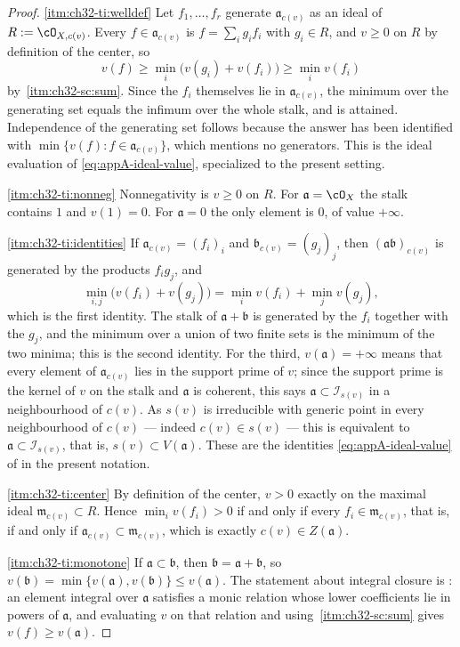 \begin{proof}
\cref{itm:ch32-ti:welldef}  Let $f_1,\ldots,f_r$ generate
$\mathfrak a_{c(v)}$ as an ideal of $R:=\cO_{X,c(v)}$.  Every
$f\in\mathfrak a_{c(v)}$ is $f=\sum_ig_if_i$ with $g_i\in R$, and
$v\geq0$ on $R$ by definition of the center, so
\[
 v(f)\geq\min_i\bigl(v(g_i)+v(f_i)\bigr)\geq\min_iv(f_i)
\]
by \,\cref{itm:ch32-sc:sum}.  Since the
$f_i$ themselves lie in $\mathfrak a_{c(v)}$, the minimum over the
generating set equals the infimum over the whole stalk, and is attained.
Independence of the generating set follows because the answer has been
identified with $\min\{v(f):f\in\mathfrak a_{c(v)}\}$, which mentions no
generators.  This is the ideal evaluation of \eqref{eq:appA-ideal-value},
specialized to the present setting.

\cref{itm:ch32-ti:nonneg}  Nonnegativity is $v\geq0$ on $R$.  For
$\mathfrak a=\cO_X$ the stalk contains $1$ and $v(1)=0$.  For
$\mathfrak a=0$ the only element is $0$, of value $+\infty$.

\cref{itm:ch32-ti:identities}  If $\mathfrak a_{c(v)}=(f_i)_i$ and
$\mathfrak b_{c(v)}=(g_j)_j$, then $(\mathfrak a\mathfrak b)_{c(v)}$ is
generated by the products $f_ig_j$, and
\[
 \min_{i,j}\bigl(v(f_i)+v(g_j)\bigr)=\min_iv(f_i)+\min_jv(g_j),
\]
which is the first identity.  The stalk of $\mathfrak a+\mathfrak b$ is
generated by the $f_i$ together with the $g_j$, and the minimum over a
union of two finite sets is the minimum of the two minima; this is the second
identity.  For the third, $v(\mathfrak a)=+\infty$ means that every element
of $\mathfrak a_{c(v)}$ lies in the support prime of $v$; since the
support prime is the kernel of $v$ on the stalk and $\mathfrak a$ is
coherent, this says $\mathfrak a\subset\mathcal I_{s(v)}$ in a neighbourhood
of $c(v)$.  As $s(v)$ is irreducible with generic point in every
neighbourhood of $c(v)$ --- indeed $c(v)\in s(v)$ --- this is equivalent
to $\mathfrak a\subset\mathcal I_{s(v)}$, that is,
$s(v)\subset V(\mathfrak a)$.  These are the identities
\eqref{eq:appA-ideal-value} of  in the
present notation.

\cref{itm:ch32-ti:center}  By definition of the center, $v>0$ exactly on the
maximal ideal $\mathfrak m_{c(v)}\subset R$.  Hence
$\min_iv(f_i)>0$ if and only if every $f_i\in\mathfrak m_{c(v)}$, that
is, if and only if $\mathfrak a_{c(v)}\subset\mathfrak m_{c(v)}$, which is
exactly $c(v)\in Z(\mathfrak a)$.

\cref{itm:ch32-ti:monotone}  If $\mathfrak a\subset\mathfrak b$, then
$\mathfrak b=\mathfrak a+\mathfrak b$, so
$v(\mathfrak b)=\min\{v(\mathfrak a),v(\mathfrak b)\}\leq v(\mathfrak a)$.
The statement about integral closure is
: an element integral over
$\mathfrak a$ satisfies a monic relation whose lower coefficients lie in
powers of $\mathfrak a$, and evaluating $v$ on that relation and using
\,\cref{itm:ch32-sc:sum} gives
$v(f)\geq v(\mathfrak a)$.
\end{proof}

